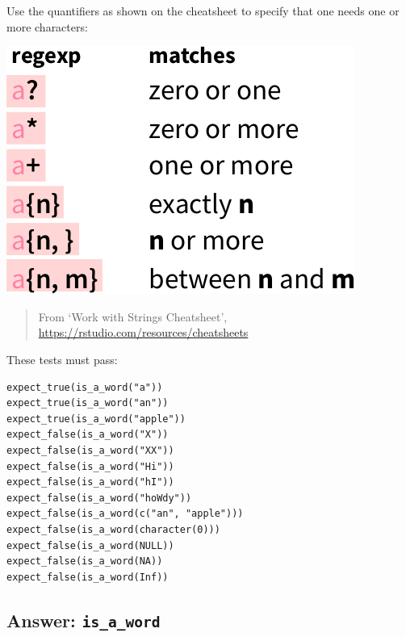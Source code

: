 \documentclass[]{book}
\newenvironment{Shaded}{}{}
\newcommand{\ControlFlowTok}[1]{\textcolor[rgb]{0.00,0.44,0.13}{\textbf{#1}}}
\newcommand{\DecValTok}[1]{\textcolor[rgb]{0.25,0.63,0.44}{#1}}
\newcommand{\KeywordTok}[1]{\textcolor[rgb]{0.00,0.44,0.13}{\textbf{#1}}}
\newcommand{\NormalTok}[1]{#1}
\newcommand{\OperatorTok}[1]{\textcolor[rgb]{0.40,0.40,0.40}{#1}}
\newcommand{\StringTok}[1]{\textcolor[rgb]{0.25,0.44,0.63}{#1}}
\begin{document}
Use the quantifiers as shown on the cheatsheet to specify that one needs
one or more characters:

\includegraphics{06_quantifiers.png}

\begin{quote}
From `Work with Strings Cheatsheet', \url{https://rstudio.com/resources/cheatsheets}
\end{quote}

These tests must pass:

\begin{verbatim}
expect_true(is_a_word("a"))
expect_true(is_a_word("an"))
expect_true(is_a_word("apple"))
expect_false(is_a_word("X"))
expect_false(is_a_word("XX"))
expect_false(is_a_word("Hi"))
expect_false(is_a_word("hI"))
expect_false(is_a_word("hoWdy"))
expect_false(is_a_word(c("an", "apple")))
expect_false(is_a_word(character(0)))
expect_false(is_a_word(NULL))
expect_false(is_a_word(NA))
expect_false(is_a_word(Inf))
\end{verbatim}

\hypertarget{answer-is_a_word}{%
\subsection{\texorpdfstring{Answer: \texttt{is\_a\_word}}{Answer: is\_a\_word}}\label{answer-is_a_word}}

\begin{Shaded}
\end{Shaded}
\end{document}
